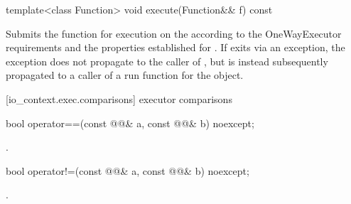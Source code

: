 %
\begin{itemdecl}
template<class Function>
  void execute(Function&& f) const
\end{itemdecl}

\begin{itemdescr}
\pnum
\effects Submits the function  for execution on the  according to the OneWayExecutor requirements and the properties established for . If  exits via an exception, the exception does not propagate to the caller of , but is instead subsequently propagated to a caller of a run function for the  object.
\end{itemdescr}



[io_context.exec.comparisons]{ executor comparisons}

%
\begin{itemdecl}
bool operator==(const @@& a, const @@& b) noexcept;
\end{itemdecl}

\begin{itemdescr}
\pnum
\returns {}.
\end{itemdescr}

%
\begin{itemdecl}
bool operator!=(const @@& a, const @@& b) noexcept;
\end{itemdecl}

\begin{itemdescr}
\pnum
\returns {}.
\end{itemdescr}




